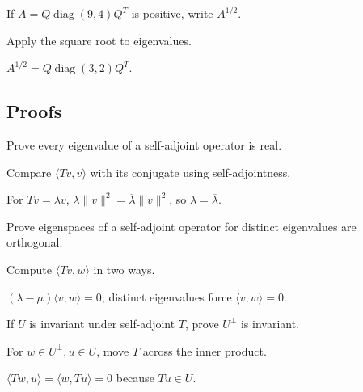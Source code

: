 \begin{exercise}\label{exr:i16-expand-05}
If \(A=Q\operatorname{diag}(9,4)Q^T\) is positive, write \(A^{1/2}\).
\end{exercise}
\begin{hint}
Apply the square root to eigenvalues.
\end{hint}
\begin{solution}
\(A^{1/2}=Q\operatorname{diag}(3,2)Q^T\).
\end{solution}

\subsection*{Proofs}

\begin{exercise}\label{exr:i16-expand-06}
Prove every eigenvalue of a self-adjoint operator is real.
\end{exercise}
\begin{hint}
Compare \(\langle Tv,v\rangle\) with its conjugate using self-adjointness.
\end{hint}
\begin{solution}
For \(Tv=\lambda v\), \(\lambda\|v\|^2=\overline{\lambda}\|v\|^2\), so \(\lambda=\overline\lambda\).
\end{solution}

\begin{exercise}\label{exr:i16-expand-07}
Prove eigenspaces of a self-adjoint operator for distinct eigenvalues are orthogonal.
\end{exercise}
\begin{hint}
Compute \(\langle Tv,w\rangle\) in two ways.
\end{hint}
\begin{solution}
\((\lambda-\mu)\langle v,w\rangle=0\); distinct eigenvalues force \(\langle v,w\rangle=0\).
\end{solution}

\begin{exercise}\label{exr:i16-expand-08}
If \(U\) is invariant under self-adjoint \(T\), prove \(U^\perp\) is invariant.
\end{exercise}
\begin{hint}
For \(w\in U^\perp,u\in U\), move \(T\) across the inner product.
\end{hint}
\begin{solution}
\(\langle Tw,u\rangle=\langle w,Tu\rangle=0\) because \(Tu\in U\).
\end{solution}


